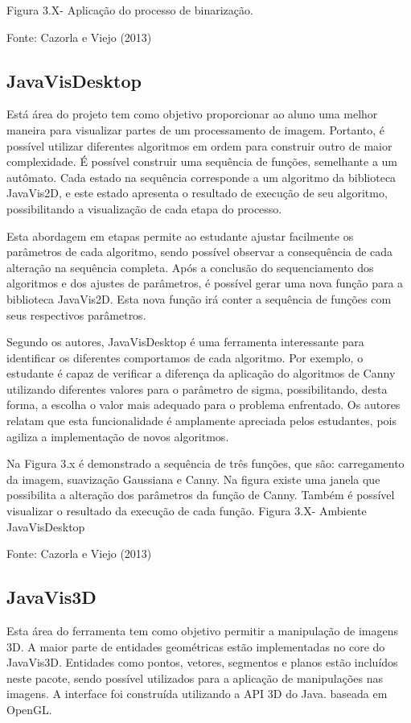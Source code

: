 \documentclass[
	12pt,				%
	oneside,			%
	a4paper,			%
	english,			%
	french,				%
	spanish,			%
	brazil,				%
	]{abntex2}
\begin{document}
Figura 3.X- Aplicação do processo de binarização. 

Fonte: Cazorla e Viejo  (2013)

\subsection{JavaVisDesktop}

Está área do projeto tem como objetivo proporcionar ao aluno uma melhor maneira para visualizar partes de um processamento de imagem. Portanto, é possível utilizar diferentes algoritmos em ordem para construir outro de maior complexidade. É possível construir uma sequência de funções, semelhante a um autômato. Cada estado na sequência corresponde a um algoritmo da biblioteca JavaVis2D, e este estado apresenta o resultado de execução de seu algoritmo, possibilitando a visualização de cada etapa do processo.

Esta abordagem em etapas permite ao estudante ajustar facilmente os parâmetros de cada algoritmo, sendo possível observar a consequência de cada alteração na sequência completa. Após a conclusão do sequenciamento dos algoritmos e dos ajustes de parâmetros, é possível gerar uma nova função para a biblioteca JavaVis2D. Esta nova função irá conter a sequência de funções com seus respectivos parâmetros.

Segundo os autores, JavaVisDesktop é uma ferramenta interessante para identificar os diferentes comportamos de cada algoritmo. Por exemplo, o estudante é capaz de verificar a diferença da aplicação do algoritmos de Canny utilizando diferentes valores para o parâmetro de sigma, possibilitando, desta forma, a escolha o valor mais adequado para o problema enfrentado. Os autores relatam que esta funcionalidade é amplamente apreciada pelos estudantes, pois agiliza a implementação de novos algoritmos.

Na Figura 3.x é demonstrado a sequência de três funções, que são: carregamento da imagem, suavização Gaussiana e Canny. Na figura existe uma janela que possibilita a alteração dos parâmetros da função de Canny. Também é possível visualizar o resultado da execução de cada função.
Figura 3.X- Ambiente JavaVisDesktop

Fonte: Cazorla e Viejo  (2013)

\subsection{JavaVis3D}

Esta área do ferramenta tem como objetivo permitir a manipulação de imagens 3D. A maior parte de entidades geométricas estão implementadas no core do JavaVis3D. Entidades como pontos, vetores, segmentos e planos estão incluídos neste pacote, sendo possível utilizados para a aplicação de manipulações nas imagens. A interface foi construída utilizando a API 3D do Java. baseada em OpenGL.
\end{document}
